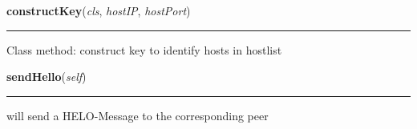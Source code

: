     \label{host:Host:constructKey}

    \vspace{0.5ex}

\hspace{.8\funcindent}\begin{boxedminipage}{\funcwidth}

    \raggedright \textbf{constructKey}(\textit{cls}, \textit{hostIP}, \textit{hostPort})

    \vspace{-1.5ex}

    \rule{\textwidth}{0.5\fboxrule}
\setlength{\parskip}{2ex}
    Class method: construct key to identify hosts in hostlist

\setlength{\parskip}{1ex}
    \end{boxedminipage}

    \label{host:Host:sendHello}

    \vspace{0.5ex}

\hspace{.8\funcindent}\begin{boxedminipage}{\funcwidth}

    \raggedright \textbf{sendHello}(\textit{self})

    \vspace{-1.5ex}

    \rule{\textwidth}{0.5\fboxrule}
\setlength{\parskip}{2ex}
    will send a HELO-Message to the corresponding peer

\setlength{\parskip}{1ex}
    \end{boxedminipage}

